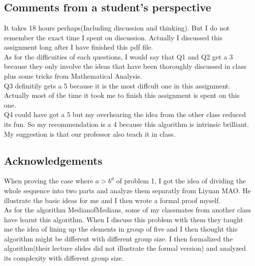 \documentclass[12pt,letterpaper]{article}
\begin{document}
\section{}
\subsection*{Comments from a student's perspective}
It takes 18 hours perhaps(Including discussion and thinking). But I do not remember the exact time I spent on discussion. Actually I discussed this assignment long after I have finished this pdf file.\\
As for the difficuities of each questions, I would say that Q1 and Q2 get a $3$ because they only involve the ideas that have been thoroughly discussed in class plus some tricks from Mathematical Analysis.\\
Q3 definitily gets a 5 because it is the most diffcult one in this assignment. Actually most of the time it took me to finish this assignment is spent on this one.\\
Q4 could have got a 5 but my overhearing the idea from the other class reduced its fun. So my recommendation is a 4 because this algorithm is intrinsic brilliant. My suggestion is that our professor also teach it in class.
\subsection*{Acknowledgements}
When proving the case where $a>b^d$ of problem 1, I got the idea of dividing the whole sequence into two parts and analyze them separatly from Liyuan MAO. He illustrate the basic ideas for me and I then wrote a formal proof myself.\\
As for the algorithm MedianofMedians, some of my classmates from another class have learnt this algorithm. When I discuss this problem with them they taught me the idea of lining up the elements in group of five and I then thought this algorithm might be different with different group size. I then formalized the algorithm(their lecture slides did not illustrate the formal version) and analyzed its complexity with different group size.
\end{document}
